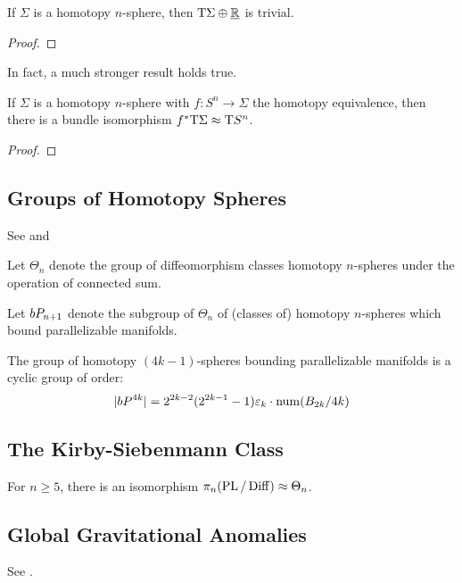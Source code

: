 \begin{theorem}
  If $\Sigma$ is a homotopy $n$-sphere, then $\mathrm{T} \Sigma \oplus \underline{\mathbb{R}}$ is trivial. 
\end{theorem}
\begin{proof}
\end{proof}

In fact, a much stronger result holds true.
\begin{theorem}
  If $\Sigma$ is a homotopy $n$-sphere with $f : S^n \to \Sigma$ the homotopy equivalence, then there is a bundle isomorphism $f^*\mathrm{T}\Sigma \approx \mathrm{T} S^n$.
\end{theorem}
\begin{proof}
\end{proof}

\subsection*{Groups of Homotopy Spheres}

See \cite{milnor1963groups} and \cite{levine1985lectures}

\begin{definition}
  Let $\Theta_n$ denote the group of diffeomorphism classes homotopy $n$-spheres under the operation of connected sum.
\end{definition}

\begin{definition}
\end{definition}

\begin{definition}
  Let $bP_{n+1}$ denote the subgroup of $\Theta_n$ of (classes of) homotopy $n$-spheres which bound parallelizable manifolds.
\end{definition}

\begin{theorem}
  The group of homotopy $(4k-1)$-spheres bounding parallelizable manifolds is a cyclic group of order:
  \[
    |bP^{4k}| = 2^{2k-2}(2^{2k-1}-1)\varepsilon_k\cdot \mathrm{num}(B_{2k}/4k) 
  \]
\end{theorem}

\subsection*{The Kirby-Siebenmann Class}

\begin{theorem}
  For $n\geq 5$, there is an isomorphism $\pi_n(\operatorname{PL}/\operatorname{Diff})\approx \Theta_n$.
\end{theorem}

\subsection*{Global Gravitational Anomalies}

See \cite{witten1985global}.
